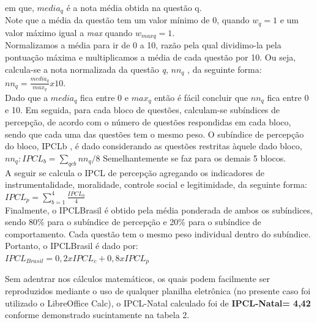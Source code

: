\documentclass[
	12pt,				%
	openright,			%
	twoside,			%
	a4paper,			%
	chapter=TITLE,		%
	section=TITLE,		%
	subsection=TITLE,	%
	subsubsection=TITLE,%
	spanish,            %
	english,			%
	brazil				%
	]{abntex2}
\begin{document}
\begin{citacao}
	em que, $media_{q}$ é a nota média obtida na questão q.\\
	Note que a média da questão tem um valor mínimo de 0, quando $w_{q}=1$ e um valor máximo igual a \textit{max} quando $w_{maxq} = 1$.\\	
	Normalizamos a média para ir de 0 a 10, razão pela qual dividimo-la pela pontuação máxima e multiplicamos a média de cada questão por 10. Ou seja, calcula-se a nota normalizada da questão \textit{q}, $nn_{q}$ , da seguinte forma:\\
	{\fontsize{12}{12}\selectfont
	$nn_{q} = \frac{media_{q}}{max_{q}} x 10$}.\\
	Dado que a $media_{q}$ fica entre 0 e $max_{q}$ então é fácil concluir que $nn_{q}$ fica entre 0 e 10.
	Em seguida, para cada bloco de questões, calculam-se subíndices de percepção, de acordo com o número de questões respondidas em cada bloco, sendo que cada uma das questões tem o mesmo peso. O subíndice de percepção do bloco, IPCLb , é dado considerando as questões restritas àquele dado bloco,{\fontsize{12}{12}\selectfont $nn_{q}:IPCL_{b}=\sum_{qcb}^{} nn_{q}/8$}
	Semelhantemente se faz para os demais 5 blocos.\\
	A seguir se calcula o IPCL de percepção agregando os indicadores de instrumentalidade, moralidade, controle social e legitimidade, da seguinte forma:\\
	{\fontsize{12}{12}\selectfont
	$IPCL_{p}=\sum\limits_{b=1}^{4} \frac{IPCL_{b}}{4}$}\\
	Finalmente, o IPCLBrasil é obtido pela média ponderada de ambos os subíndices, sendo 80\% para o subíndice de percepção e 20\% para o subíndice de comportamento. Cada questão tem o mesmo peso individual dentro do subíndice.\\
	Portanto, o IPCLBrasil é dado por:\\
	{\fontsize{12}{12}\selectfont
		$IPCL_{Brasil}= 0,2 x IPCL_{c} + 0,8 x IPCL_{p}$}\\
	\cite[p. ~7-8]{FGV}
\end{citacao}
\par
Sem adentrar nos cálculos matemáticos, os quais podem facilmente ser reproduzidos mediante o uso de qualquer planilha eletrônica (no presente caso foi utilizado o LibreOffice Calc), o IPCL-Natal calculado
foi de \textbf{IPCL-Natal= 4,42} conforme demonstrado sucintamente na tabela 2.
\end{document}
